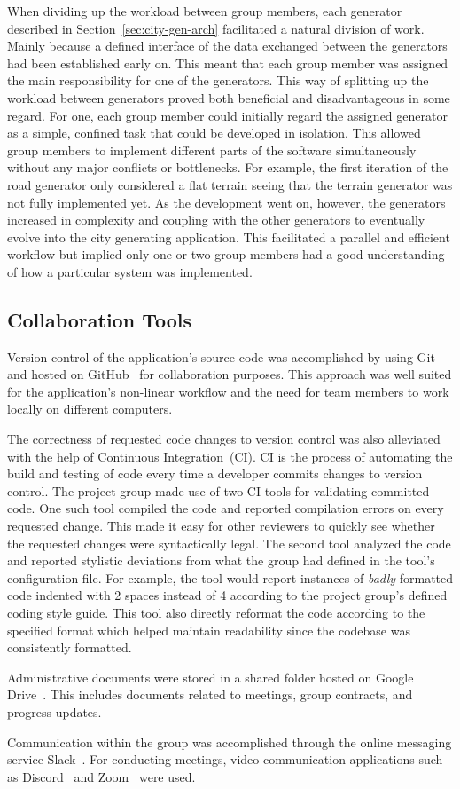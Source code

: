When dividing up the workload between group members, each generator described in Section~\ref{sec:city-gen-arch} facilitated a natural division of work.
Mainly because a defined interface of the data exchanged between the generators had been established early on.
This meant that each group member was assigned the main responsibility for one of the generators. This way of splitting up the workload between generators proved both beneficial and disadvantageous in some regard.
For one, each group member could initially regard the assigned generator as a simple, confined task that could be developed in isolation.
This allowed group members to implement different parts of the software simultaneously without any major conflicts or bottlenecks.
For example, the first iteration of the road generator only considered a flat terrain seeing that the terrain generator was not fully implemented yet.
As the development went on, however, the generators increased in complexity and coupling with the other generators to eventually evolve into the city generating application.
This facilitated a parallel and efficient workflow but implied only one or two group members had a good understanding of how a particular system was implemented.

\subsection{Collaboration Tools}
Version control of the application's source code was accomplished by using Git~\cite{git} and hosted on GitHub~\cite{github} for collaboration purposes.
This approach was well suited for the application's non-linear workflow and the need for team members to work locally on different computers.

The correctness of requested code changes to version control was also alleviated with the help of Continuous Integration~(CI).
CI is the process of automating the build and testing of code every time a developer commits changes to version control.
The project group made use of two CI tools for validating committed code.
One such tool compiled the code and reported compilation errors on every requested change.
This made it easy for other reviewers to quickly see whether the requested changes were syntactically legal.
The second tool analyzed the code and reported stylistic deviations from what the group had defined in the tool's configuration file.
For example, the tool would report instances of \textit{badly} formatted code indented with 2 spaces instead of 4 according to the project group's defined coding style guide.
This tool also directly reformat the code according to the specified format which helped maintain readability since the codebase was consistently formatted.

Administrative documents were stored in a shared folder hosted on Google Drive~\cite{google_drive}.
This includes documents related to meetings, group contracts, and progress updates.

Communication within the group was accomplished through the online messaging service Slack~\cite{slack}.
For conducting meetings, video communication applications such as Discord~\cite{discord} and Zoom~\cite{zoom} were used.


